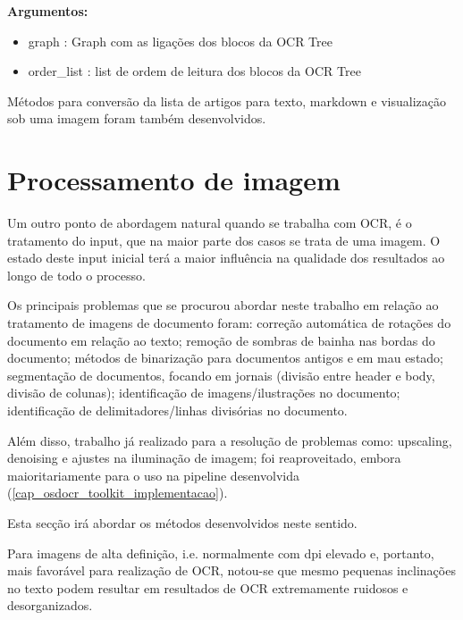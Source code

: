 \textbf{Argumentos:}
\begin{itemize}\setlength\itemsep{-0.3em}
	\item graph : Graph com as ligações dos blocos da OCR Tree
	\item order\_list : list de ordem de leitura dos blocos da OCR Tree
\end{itemize}



Métodos para conversão da lista de artigos para texto, markdown e visualização sob uma imagem foram também desenvolvidos.



\section{Processamento de imagem}
\label{contribution_image_processing}


Um outro ponto de abordagem natural quando se trabalha com OCR, é o tratamento do input, que na maior parte dos casos se trata de uma imagem. O estado deste input inicial terá a maior influência na qualidade dos resultados ao longo de todo o processo.

Os principais problemas que se procurou abordar neste trabalho em relação ao tratamento de imagens de documento foram: correção automática de rotações do documento em relação ao texto; remoção de sombras de bainha nas bordas do documento; métodos de binarização para documentos antigos e em mau estado; segmentação de documentos, focando em jornais (divisão entre header e body, divisão de colunas); identificação de imagens/ilustrações no documento; identificação de delimitadores/linhas divisórias no documento. 

Além disso, trabalho já realizado para a resolução de problemas como: upscaling, denoising e ajustes na iluminação de imagem; foi reaproveitado, embora maioritariamente para o uso na pipeline desenvolvida (\ref{cap_osdocr_toolkit_implementacao}).


Esta secção irá abordar os métodos desenvolvidos neste sentido.


\label{contribution_image_rotation_correction}

Para imagens de alta definição, i.e. normalmente com dpi elevado e, portanto, mais favorável para realização de OCR, notou-se que mesmo pequenas inclinações no texto podem resultar em resultados de OCR extremamente ruidosos e desorganizados.

